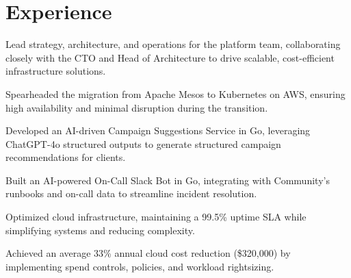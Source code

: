 \documentclass[]{resume}
\begin{document}
%
%

%
%

%
%

\begin{minipage}[t]{0.60\textwidth}

\section{Experience}
\vspace{\topsep} %
\begin{tightemize}
\item Lead strategy, architecture, and operations for the platform team, collaborating closely with the CTO and Head of Architecture to drive scalable, cost-efficient infrastructure solutions.
\item Spearheaded the migration from Apache Mesos to Kubernetes on AWS, ensuring high availability and minimal disruption during the transition.
\item Developed an AI-driven Campaign Suggestions Service in Go, leveraging ChatGPT-4o structured outputs to generate structured campaign recommendations for clients.
\item Built an AI-powered On-Call Slack Bot in Go, integrating with Community’s runbooks and on-call data to streamline incident resolution.
\item Optimized cloud infrastructure, maintaining a 99.5\% uptime SLA while simplifying systems and reducing complexity.
\item Achieved an average 33\% annual cloud cost reduction (\$320,000) by implementing spend controls, policies, and workload rightsizing.
\end{tightemize}
\sectionsep


\end{minipage}
\end{document}
